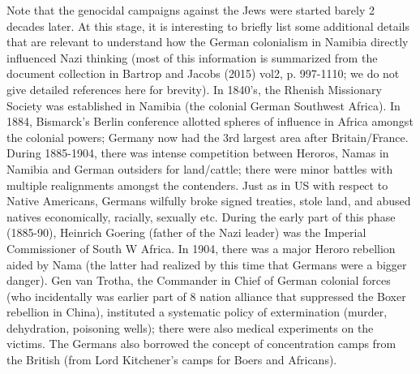 Note that the genocidal campaigns against the Jews were started barely 2 decades later. At this stage, it is interesting to briefly list some additional details that are relevant to understand how the German colonialism in Namibia directly influenced Nazi thinking (most of this information is summarized from the document collection in Bartrop and Jacobs (2015) vol2, p. 997-1110; we do not give detailed references here for brevity). In 1840’s, the Rhenish Missionary Society was established in Namibia (the colonial German Southwest Africa). In 1884, Bismarck’s Berlin conference allotted spheres of influence in Africa amongst the colonial powers; Germany now had the 3rd largest area after Britain/France. During 1885-1904, there was intense competition between Heroros, Namas in Namibia and German outsiders for land/cattle; there were minor battles with multiple realignments amongst the contenders. Just as in US with respect to Native Americans, Germans wilfully broke signed treaties, stole land, and abused natives economically, racially, sexually etc. During the early part of this phase (1885-90), Heinrich Goering (father of the Nazi leader) was the Imperial Commissioner of South W Africa. In 1904, there was a major Heroro rebellion aided by Nama (the latter had realized by this time that Germans were a bigger danger). Gen van Trotha, the Commander in Chief of German colonial forces (who incidentally was earlier part of 8 nation alliance that suppressed the Boxer rebellion in China), instituted a systematic policy of extermination (murder, dehydration, poisoning wells); there were also medical experiments on the victims. The Germans also borrowed the concept of concentration camps from the British (from Lord Kitchener's camps for Boers and Africans).

